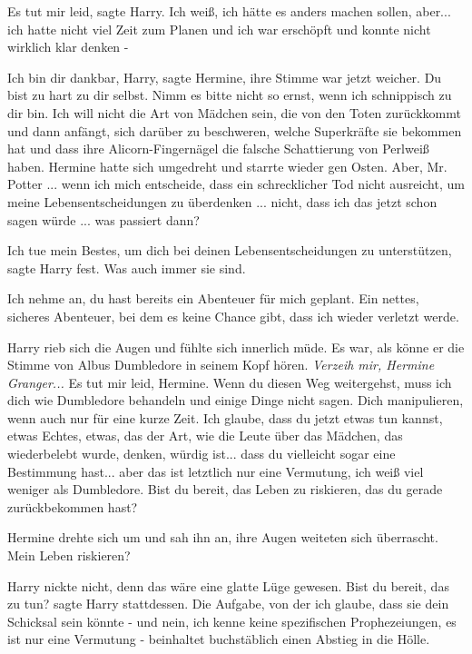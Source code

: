 \glqq Es tut mir leid\grqq{}, sagte Harry. \glqq Ich weiß, ich hätte es anders
machen sollen, aber... ich hatte nicht viel Zeit zum Planen und ich war
erschöpft und konnte nicht wirklich klar denken -\grqq{}

\glqq Ich bin dir dankbar, Harry\grqq{}, sagte Hermine, ihre Stimme war jetzt
weicher. \glqq Du bist zu hart zu dir selbst. Nimm es bitte nicht so ernst, wenn
ich schnippisch zu dir bin. Ich will nicht die Art von Mädchen sein, die von den
Toten zurückkommt und dann anfängt, sich darüber zu beschweren, welche
Superkräfte sie bekommen hat und dass ihre Alicorn-Fingernägel die falsche
Schattierung von Perlweiß haben.\grqq{} Hermine hatte sich umgedreht und starrte
wieder gen Osten. \glqq Aber, Mr. Potter ... wenn ich mich entscheide, dass ein
schrecklicher Tod nicht ausreicht, um meine Lebensentscheidungen zu überdenken
... nicht, dass ich das jetzt schon sagen würde ... was passiert dann?\grqq{}

\glqq Ich tue mein Bestes, um dich bei deinen Lebensentscheidungen zu
unterstützen\grqq{}, sagte Harry fest. \glqq Was auch immer sie sind.\grqq{}

\glqq Ich nehme an, du hast bereits ein Abenteuer für mich geplant. Ein nettes,
sicheres Abenteuer, bei dem es keine Chance gibt, dass ich wieder verletzt
werde.\grqq{}

Harry rieb sich die Augen und fühlte sich innerlich müde. Es war, als könne er
die Stimme von Albus Dumbledore in seinem Kopf hören.
\emph{Verzeih mir, Hermine Granger... }
\glqq Es tut mir leid, Hermine. Wenn du diesen Weg weitergehst, muss ich dich
wie Dumbledore behandeln und einige Dinge nicht sagen. Dich manipulieren, wenn
auch nur für eine kurze Zeit. Ich glaube, dass du jetzt etwas tun kannst, etwas
Echtes, etwas, das der Art, wie die Leute über das Mädchen, das wiederbelebt
wurde, denken, würdig ist... dass du vielleicht sogar eine Bestimmung hast...
aber das ist letztlich nur eine Vermutung, ich weiß viel weniger als Dumbledore.
Bist du bereit, das Leben zu riskieren, das du gerade zurückbekommen
hast?\grqq{}

Hermine drehte sich um und sah ihn an, ihre Augen weiteten sich überrascht.
\glqq Mein Leben riskieren?\grqq{}

Harry nickte nicht, denn das wäre eine glatte Lüge gewesen. \glqq Bist du
bereit, das zu tun?\grqq{} sagte Harry stattdessen. \glqq Die Aufgabe, von der
ich glaube, dass sie dein Schicksal sein könnte - und nein, ich kenne keine
spezifischen Prophezeiungen, es ist nur eine Vermutung - beinhaltet buchstäblich
einen Abstieg in die Hölle.\grqq{}

